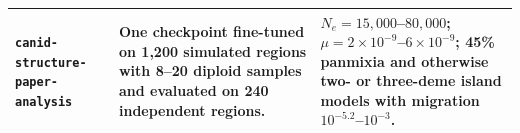 \begin{tabular}{@{}p{3.55cm}p{6.15cm}p{7.05cm}@{}}
\texttt{canid-structure-}\linebreak\texttt{paper-analysis} & One checkpoint fine-tuned on 1,200 simulated regions with 8--20 diploid samples and evaluated on 240 independent regions. & $N_e=15{,}000$--$80{,}000$; $\mu=2\times10^{-9}$--$6\times10^{-9}$; 45\% panmixia and otherwise two- or three-deme island models with migration $10^{-5.2}$--$10^{-3}$. \\
\bottomrule
\end{tabular}
